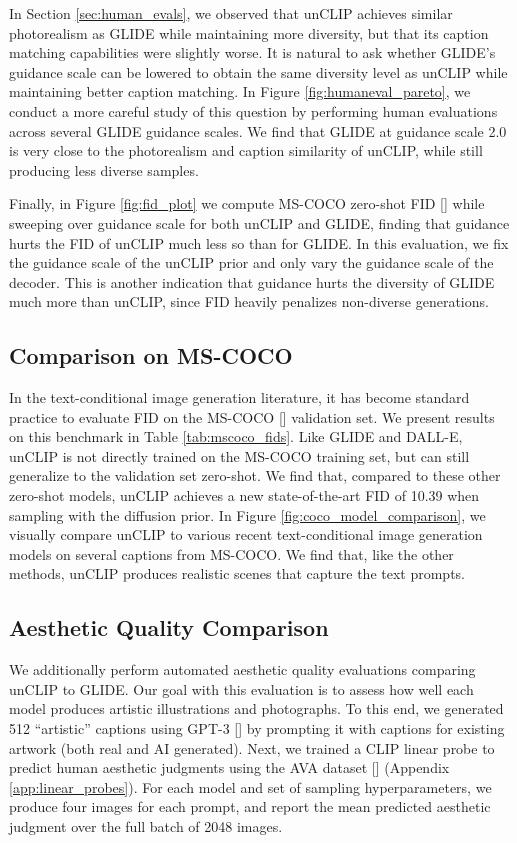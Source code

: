 In Section \ref{sec:human_evals}, we observed that unCLIP achieves similar photorealism as GLIDE while maintaining more diversity, but that its caption matching capabilities were slightly worse. It is natural to ask whether GLIDE's guidance scale can be lowered to obtain the same diversity level as unCLIP while maintaining better caption matching. In Figure \ref{fig:humaneval_pareto}, we conduct a more careful study of this question by performing human evaluations across several GLIDE guidance scales. We find that GLIDE at guidance scale 2.0 is very close to the photorealism and caption similarity of unCLIP, while still producing less diverse samples.

Finally, in Figure \ref{fig:fid_plot} we compute MS-COCO zero-shot FID [] while sweeping over guidance scale for both unCLIP and GLIDE, finding that guidance hurts the FID of unCLIP much less so than for GLIDE. In this evaluation, we fix the guidance scale of the unCLIP prior and only vary the guidance scale of the decoder. This is another indication that guidance hurts the diversity of GLIDE much more than unCLIP, since FID heavily penalizes non-diverse generations.

\subsection{Comparison on MS-COCO}
\label{sec:fid}

In the text-conditional image generation literature, it has become standard practice to evaluate FID on the MS-COCO [] validation set. We present results on this benchmark in Table \ref{tab:mscoco_fids}. Like GLIDE and DALL-E, unCLIP is not directly trained on the MS-COCO training set, but can still generalize to the validation set zero-shot. We find that, compared to these other zero-shot models, unCLIP achieves a new state-of-the-art FID of 10.39 when sampling with the diffusion prior. In Figure \ref{fig:coco_model_comparison}, we visually compare unCLIP to various recent text-conditional image generation models on several captions from MS-COCO. We find that, like the other methods, unCLIP produces realistic scenes that capture the text prompts.

\subsection{Aesthetic Quality Comparison}
\label{sec:aesthetic}

We additionally perform automated aesthetic quality evaluations comparing unCLIP to GLIDE. Our goal with this evaluation is to assess how well each model produces artistic illustrations and photographs. To this end, we generated 512 ``artistic'' captions using GPT-3 [] by prompting it with captions for existing artwork (both real and AI generated). Next, we trained a CLIP linear probe to predict human aesthetic judgments using the AVA dataset [] (Appendix \ref{app:linear_probes}). For each model and set of sampling hyperparameters, we produce four images for each prompt, and report the mean predicted aesthetic judgment over the full batch of 2048 images.

